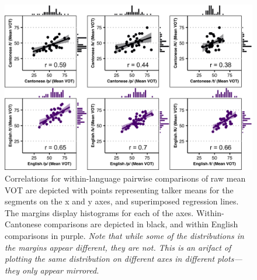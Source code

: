 \begin{figure}[htbp]
  \begin{center}
  \includegraphics[width=0.9\linewidth]{figures/ch4_correlations1_5in.png} 
  \caption{Correlations for within-language pairwise comparisons of raw mean VOT are depicted with points representing talker means for the segments on the x and y axes, and superimposed regression lines. The margins display histograms for each of the axes. Within-Cantonese comparisons are depicted in black, and within English comparisons in purple. \textit{Note that while some of the distributions in the margins appear different, they are not. This is an arifact of plotting the same distribution on different axes in different plots---they only appear mirrored.}}
  \label{ch4:fig:correlations1}
  \end{center}
\end{figure}

